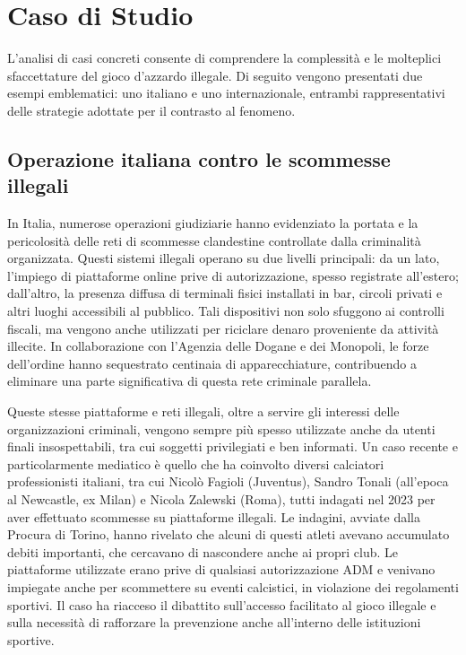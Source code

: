 \documentclass[a4paper,12pt]{article}
\begin{document}
\section{Caso di Studio}

L’analisi di casi concreti consente di comprendere la complessità e le molteplici sfaccettature del gioco d’azzardo illegale. Di seguito vengono presentati due esempi emblematici: uno italiano e uno internazionale, entrambi rappresentativi delle strategie adottate per il contrasto al fenomeno.

\subsection{Operazione italiana contro le scommesse illegali}
In Italia, numerose operazioni giudiziarie hanno evidenziato la portata e la pericolosità delle reti di scommesse clandestine controllate dalla criminalità organizzata. Questi sistemi illegali operano su due livelli principali: da un lato, l’impiego di piattaforme online prive di autorizzazione, spesso registrate all’estero; dall’altro, la presenza diffusa di terminali fisici installati in bar, circoli privati e altri luoghi accessibili al pubblico. Tali dispositivi non solo sfuggono ai controlli fiscali, ma vengono anche utilizzati per riciclare denaro proveniente da attività illecite. In collaborazione con l’Agenzia delle Dogane e dei Monopoli, le forze dell’ordine hanno sequestrato centinaia di apparecchiature, contribuendo a eliminare una parte significativa di questa rete criminale parallela.

Queste stesse piattaforme e reti illegali, oltre a servire gli interessi delle organizzazioni criminali, vengono sempre più spesso utilizzate anche da utenti finali insospettabili, tra cui soggetti privilegiati e ben informati. Un caso recente e particolarmente mediatico è quello che ha coinvolto diversi calciatori professionisti italiani, tra cui Nicolò Fagioli (Juventus), Sandro Tonali (all’epoca al Newcastle, ex Milan) e Nicola Zalewski (Roma), tutti indagati nel 2023 per aver effettuato scommesse su piattaforme illegali. Le indagini, avviate dalla Procura di Torino, hanno rivelato che alcuni di questi atleti avevano accumulato debiti importanti, che cercavano di nascondere anche ai propri club. Le piattaforme utilizzate erano prive di qualsiasi autorizzazione ADM e venivano impiegate anche per scommettere su eventi calcistici, in violazione dei regolamenti sportivi. Il caso ha riacceso il dibattito sull’accesso facilitato al gioco illegale e sulla necessità di rafforzare la prevenzione anche all’interno delle istituzioni sportive.
\end{document}

